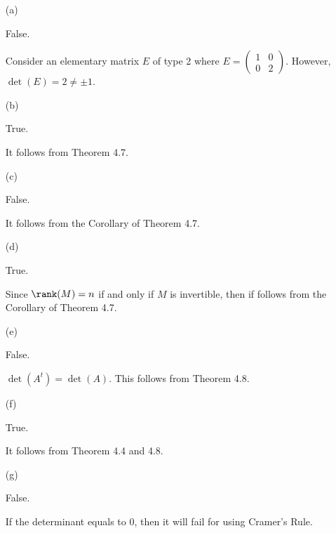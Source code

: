 \begin{Exercise}
\begin{enumerate}[(a)]
\item[(a)]
\begin{answer}
False.
\end{answer}
\begin{solution}
Consider an elementary matrix $E$ of type 2 where $E = \begin{pmatrix}
1 & 0 \\
0 & 2 
\end{pmatrix}$. However, $\det(E) = 2 \neq \pm 1$.
\end{solution}

\item[(b)]
\begin{answer}
True.
\end{answer}
\begin{solution}
It follows from Theorem 4.7.
\end{solution}

\item[(c)]
\begin{answer}
False.
\end{answer}
\begin{solution}
It follows from the Corollary of Theorem 4.7.
\end{solution}

\item[(d)]
\begin{answer}
True.
\end{answer}
\begin{solution}
Since $\rank(M) = n$ if and only if $M$ is invertible, then if follows from the Corollary of Theorem 4.7.
\end{solution}

\item[(e)]
\begin{answer}
False.
\end{answer}
\begin{solution}
$\det(A^t) = \det(A)$. This follows from Theorem 4.8.
\end{solution}

\item[(f)]
\begin{answer}
True.
\end{answer}
\begin{solution}
It follows from Theorem 4.4 and 4.8.
\end{solution}

\item[(g)]
\begin{answer}
False.
\end{answer}
\begin{solution}
If the determinant equals to $0$, then it will fail for using Cramer's Rule.
\end{solution}


\end{enumerate}
\end{Exercise}
